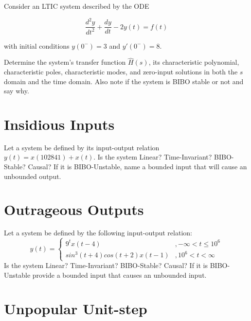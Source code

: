 \documentclass{article}
\begin{document}
Consider an LTIC system described by the ODE

$$\frac{d^2y}{dt^2}+\frac{dy}{dt}-2y(t) = f(t)$$

with initial conditions $y(0^-) = 3$ and $y'(0^-) = 8$.

Determine the system's transfer function $\hat{H}(s)$, its characteristic polynomial, characteristic poles, characteristic modes, and zero-input solutions in both the $s$ domain and the time domain. Also note if the system is BIBO stable or not and say why.

\vfill

\section{Insidious Inputs}

Let a system be defined by its input-output relation $y(t) = x(102841) + x(t)$. Is the system Linear? Time-Invariant? BIBO-Stable? Causal? If it is BIBO-Unstable, name a bounded input that will cause an unbounded output.

\vfill

\section{Outrageous Outputs}

Let a system be defined by the following input-output relation:
$$y(t) =
    \begin{cases}
      9^t x(t-4) & , -\infty < t \leq 10^6\\
      sin^3(t+4) cos(t+2) x(t-1) & , 10^6 < t < \infty
    \end{cases}$$    
Is the system Linear? Time-Invariant? BIBO-Stable? Causal? If it is BIBO-Unstable provide a bounded input that causes an unbounded input.

\vfill

\newpage



\section{Unpopular Unit-step}
\end{document}
